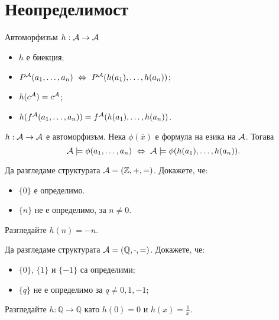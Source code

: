 \newpage

\section{Неопределимост}

Автоморфизъм $h : \mathcal{A} \to \mathcal{A}$
\begin{itemize}
\item
  $h$ е биекция;
\item
  $P^{\mathcal{A}}(a_1,\dots,a_n) \ \Leftrightarrow\  P^{\mathcal{A}}(h(a_1),\dots,h(a_n))$;
\item
  $h(c^{\mathcal{A}}) = c^{\mathcal{A}}$;
\item
  $h(f^{\mathcal{A}}(a_1,\dots,a_n)) = f^{\mathcal{A}}(h(a_1),\dots,h(a_n))$.
\end{itemize}

\begin{theorem}
  $h:\mathcal{A}\to\mathcal{A}$ е автоморфизъм. Нека $\phi(\overline{x})$ е формула на езика на $\mathcal{A}$. Тогава
  \[\mathcal{A} \models \phi(a_1,\dots,a_n) \ \Leftrightarrow\  \mathcal{A} \models \phi(h(a_1),\dots,h(a_n)).\]
\end{theorem}

\begin{problem}
  Да разгледаме структурата $\mathcal{A} = (\mathbb{Z},+,=)$.
  Докажете, че:
  \begin{itemize}
  \item 
    $\{0\}$ е определимо.
  \item
    $\{n\}$ не е определимо, за $n \neq 0$.
  \end{itemize}
\end{problem}
\begin{hint}
  Разгледайте $h(n) = -n$.
\end{hint}

\begin{problem}
  Да разгледаме структурата $\mathcal{A} = (\mathbb{Q}, \cdot, =)$.
  Докажете, че:
  \begin{itemize}
  \item
    $\{0\}$, $\{1\}$ и $\{-1\}$ са определими;
  \item
    $\{q\}$ не е определимо за $q \neq 0,1,-1$;
  \end{itemize}
\end{problem}
\begin{hint}
  Разгледайте $h:\mathbb{Q} \to \mathbb{Q}$ като
  $h(0) = 0$ и $h(x) = \frac{1}{x}$.  
\end{hint}

